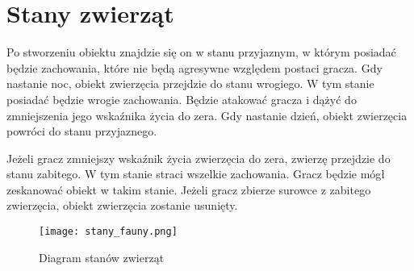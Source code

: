 \section{Stany zwierząt}

Po stworzeniu obiektu znajdzie się on w stanu przyjaznym, w którym posiadać będzie zachowania, które nie będą agresywne względem postaci gracza. Gdy nastanie noc, obiekt zwierzęcia przejdzie do stanu wrogiego. W tym stanie posiadać będzie wrogie zachowania. Będzie atakować gracza i dążyć do zmniejszenia jego wskaźnika życia do zera. Gdy nastanie dzień, obiekt zwierzęcia powróci do stanu przyjaznego.

Jeżeli gracz zmniejszy wskaźnik życia zwierzęcia do zera, zwierzę przejdzie do stanu zabitego. W tym stanie straci wszelkie zachowania. Gracz będzie mógł zeskanować obiekt w takim stanie. Jeżeli gracz zbierze surowce z zabitego zwierzęcia, obiekt zwierzęcia zostanie usunięty. 

\begin{figure}[H]
    \centering
        \texttt{[image: stany\_fauny.png]}
         \caption{Diagram stanów zwierząt}
\end{figure}